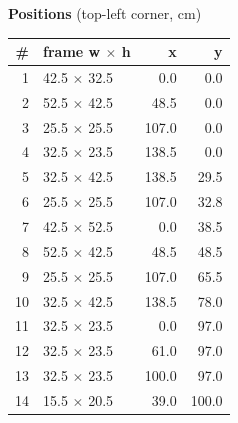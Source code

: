 \documentclass[a4paper,landscape,10pt]{article}
\begin{document}
\begin{minipage}[t]{0.25\textwidth}
\vspace{8pt}
{\bfseries Positions} (top-left corner, cm)\\[2pt]
\tiny
\begin{tabular}{@{}r l r r@{}}
\toprule
\# & frame w $\times$ h & x & y \\
\midrule
1 & 42.5 $\times$ 32.5 & 0.0 & 0.0 \\
2 & 52.5 $\times$ 42.5 & 48.5 & 0.0 \\
3 & 25.5 $\times$ 25.5 & 107.0 & 0.0 \\
4 & 32.5 $\times$ 23.5 & 138.5 & 0.0 \\
5 & 32.5 $\times$ 42.5 & 138.5 & 29.5 \\
6 & 25.5 $\times$ 25.5 & 107.0 & 32.8 \\
7 & 42.5 $\times$ 52.5 & 0.0 & 38.5 \\
8 & 52.5 $\times$ 42.5 & 48.5 & 48.5 \\
9 & 25.5 $\times$ 25.5 & 107.0 & 65.5 \\
10 & 32.5 $\times$ 42.5 & 138.5 & 78.0 \\
11 & 32.5 $\times$ 23.5 & 0.0 & 97.0 \\
12 & 32.5 $\times$ 23.5 & 61.0 & 97.0 \\
13 & 32.5 $\times$ 23.5 & 100.0 & 97.0 \\
14 & 15.5 $\times$ 20.5 & 39.0 & 100.0 \\
\bottomrule
\end{tabular}
\end{minipage}
\clearpage
\end{document}
